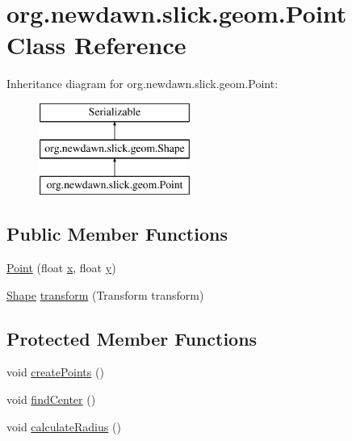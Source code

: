 \hypertarget{classorg_1_1newdawn_1_1slick_1_1geom_1_1_point}{}\section{org.\+newdawn.\+slick.\+geom.\+Point Class Reference}
\label{classorg_1_1newdawn_1_1slick_1_1geom_1_1_point}
Inheritance diagram for org.\+newdawn.\+slick.\+geom.\+Point\+:\begin{figure}[H]
\begin{center}
\leavevmode
\includegraphics[height=3.000000cm]{classorg_1_1newdawn_1_1slick_1_1geom_1_1_point}
\end{center}
\end{figure}
\subsection*{Public Member Functions}
\begin{DoxyCompactItemize}
\item 
\mbox{\hyperlink{classorg_1_1newdawn_1_1slick_1_1geom_1_1_point_a64fbbb67319dc26073ef25c688385009}{Point}} (float \mbox{\hyperlink{classorg_1_1newdawn_1_1slick_1_1geom_1_1_shape_a3e985bfff386c15a4efaad03d8ad60d3}{x}}, float \mbox{\hyperlink{classorg_1_1newdawn_1_1slick_1_1geom_1_1_shape_a9f934baded6a1b65ebb69e7e5f80ea00}{y}})
\item 
\mbox{\hyperlink{classorg_1_1newdawn_1_1slick_1_1geom_1_1_shape}{Shape}} \mbox{\hyperlink{classorg_1_1newdawn_1_1slick_1_1geom_1_1_point_a9c3bead7f43bac5c80d377c08d7829f0}{transform}} (Transform transform)
\end{DoxyCompactItemize}
\subsection*{Protected Member Functions}
\begin{DoxyCompactItemize}
\item 
void \mbox{\hyperlink{classorg_1_1newdawn_1_1slick_1_1geom_1_1_point_ad5e57ed805113788063eda20f406a5bd}{create\+Points}} ()
\item 
void \mbox{\hyperlink{classorg_1_1newdawn_1_1slick_1_1geom_1_1_point_afbfcbe702da917ba51825c4febde800a}{find\+Center}} ()
\item 
void \mbox{\hyperlink{classorg_1_1newdawn_1_1slick_1_1geom_1_1_point_a35cb6b96446be89822bc8f88faf0502a}{calculate\+Radius}} ()
\end{DoxyCompactItemize}
